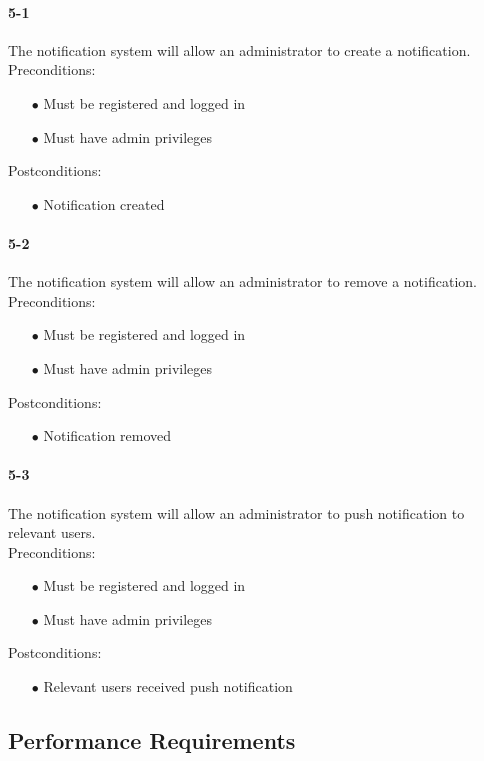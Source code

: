 \documentclass[a4paper,12pt]{article}
\begin{document}
\paragraph{5-1}
The notification system will allow an administrator to create a notification.\\
Preconditions:
\begin{itemize}
	\item[$\bullet$] Must be registered and logged in
	\item[$\bullet$] Must have admin privileges
\end{itemize}
Postconditions:
\begin{itemize}
	\item[$\bullet$] Notification created
\end{itemize}
\paragraph{5-2}
The notification system will allow an administrator to remove a notification.\\
Preconditions:
\begin{itemize}
	\item[$\bullet$] Must be registered and logged in
	\item[$\bullet$] Must have admin privileges
\end{itemize}
Postconditions:
\begin{itemize}
	\item[$\bullet$] Notification removed
\end{itemize}
\paragraph{5-3}
The notification system will allow an administrator to push notification to relevant users.\\
Preconditions:
\begin{itemize}
	\item[$\bullet$] Must be registered and logged in
	\item[$\bullet$] Must have admin privileges
\end{itemize}
Postconditions:
\begin{itemize}
	\item[$\bullet$] Relevant users received push notification
\end{itemize}
\subsection{Performance Requirements}
\end{document}
